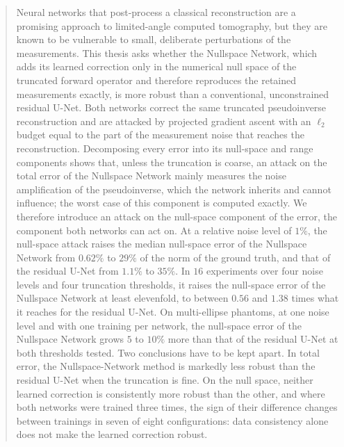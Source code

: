 \documentclass{article}
\numberwithin{equation}{section}
\begin{document}
\begin{abstract}
Neural networks that post-process a classical reconstruction are a promising approach to
limited-angle computed tomography, but they are known to be vulnerable to small, deliberate
perturbations of the measurements. This thesis asks whether the Nullspace Network, which adds its
learned correction only in the numerical null space of the truncated forward operator and therefore
reproduces the retained measurements exactly, is more robust than a conventional, unconstrained
residual U-Net. Both networks correct the same truncated pseudoinverse reconstruction and are attacked
by projected gradient ascent with an $\ell_2$ budget equal to the part of the measurement noise that
reaches the reconstruction. Decomposing every error into its null-space and range components shows
that, unless the truncation is coarse, an attack on the total error of the Nullspace Network mainly
measures the noise amplification of the pseudoinverse, which the network inherits and cannot
influence; the worst case of this component is computed exactly. We therefore introduce an attack on
the null-space component of the error, the component both networks can act on.
At a relative noise level of $1\%$, the null-space attack raises the median null-space error of the
Nullspace Network from $0.62\%$ to $29\%$ of the norm of the ground truth, and that of the residual U-Net
from $1.1\%$ to $35\%$. In $16$ experiments over four noise levels and four truncation thresholds, it
raises the null-space error of the Nullspace Network at least elevenfold, to between $0.56$ and $1.38$
times what it reaches for the residual U-Net. On multi-ellipse phantoms, at one noise level and with one
training per network, the null-space error of the Nullspace Network grows $5$ to $10\%$ more than that of
the residual U-Net at both thresholds tested. Two conclusions have to be kept apart. In
total error, the Nullspace-Network method is markedly less robust than the residual U-Net when the
truncation is fine. On the null space, neither learned correction is consistently more robust than the
other, and where both networks were trained three times, the sign of their difference changes between
trainings in seven of eight configurations: data consistency alone does not make the learned correction
robust.
\end{abstract}
\clearpage
\tableofcontents
\end{document}

